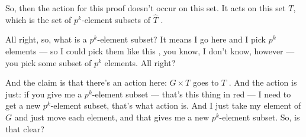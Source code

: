 \begin{proofWrapper}
\begin{content}
\begin{center}
\end{center}
\end{content}

\begin{hidden}
\end{hidden}

\begin{speech}[00:49:31 - 00:51:04]
So, then the action for this proof doesn't occur on this set. It acts on this set $T$, which is the set of $p^k$-element subsets of $\widehat{T}$ .

All right, so, what is a $p^k$-element subset? It means I go here and I pick $p^k$ elements --- so I could pick them like this , you know, I don't know, however --- you pick some subset of $p^k$ elements. All right?

And the claim is that there's an action here: $G \times T$ goes to $T$ . And the action is just: if you give me a $p^k$-element subset --- that's this thing in red  --- I need to get a new $p^k$-element subset, that's what action is. And I just take my element of $G$ and just move each element, and that gives me a new $p^k$-element subset. So, is that clear?


\end{speech}
\end{proofWrapper}
